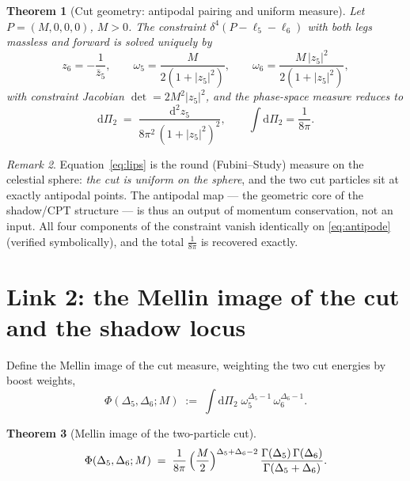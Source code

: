 \documentclass[12pt,a4paper]{article}
\theoremstyle{plain}
\newtheorem{theorem}{Theorem}[section]
\theoremstyle{definition}
\theoremstyle{remark}
\newtheorem{remark}[theorem]{Remark}
\newcommand{\dd}{\mathrm{d}}
\newcommand{\dLIPS}{\dd\Pi_2}
\begin{document}
\begin{theorem}[Cut geometry: antipodal pairing and uniform measure]
\label{thm:measure}
Let $P=(M,0,0,0)$, $M>0$.  The constraint
$\delta^4(P-\ell_5-\ell_6)$ with both legs massless and forward is
solved \emph{uniquely} by
\begin{equation}
z_6=-\frac{1}{\bar z_5},\qquad
\omega_5=\frac{M}{2(1+|z_5|^2)},\qquad
\omega_6=\frac{M\,|z_5|^2}{2(1+|z_5|^2)},
\label{eq:antipode}
\end{equation}
with constraint Jacobian $\det=2M^2|z_5|^2$, and the phase-space
measure reduces to
\begin{equation}
\dLIPS \;=\; \frac{\dd^2 z_5}{8\pi^2\,(1+|z_5|^2)^2},
\qquad \int \dLIPS=\frac{1}{8\pi}.
\label{eq:lips}
\end{equation}
\end{theorem}

\begin{remark}
Equation~\eqref{eq:lips} is the round (Fubini--Study) measure on the
celestial sphere: \emph{the cut is uniform on the sphere}, and the two
cut particles sit at exactly antipodal points.  The antipodal map ---
the geometric core of the shadow/CPT structure --- is thus an output of
momentum conservation, not an input.  All four components of the
constraint vanish identically on \eqref{eq:antipode}
(verified symbolically), and the total $\tfrac{1}{8\pi}$ is recovered
exactly.
\end{remark}

\section{Link 2: the Mellin image of the cut and the shadow locus}
\label{sec:link2}

Define the Mellin image of the cut measure, weighting the two cut
energies by boost weights,
\begin{equation}
\Phi(\Delta_5,\Delta_6;M)\;:=\;\int \dLIPS\;
\omega_5^{\Delta_5-1}\,\omega_6^{\Delta_6-1}.
\end{equation}

\begin{theorem}[Mellin image of the two-particle cut]
\label{thm:mellincut}
\begin{equation}
\Phi(\Delta_5,\Delta_6;M)
\;=\;
\frac{1}{8\pi}\,\Bigl(\frac{M}{2}\Bigr)^{\Delta_5+\Delta_6-2}\,
\frac{\Gamma(\Delta_5)\,\Gamma(\Delta_6)}{\Gamma(\Delta_5+\Delta_6)} .
\label{eq:phi}
\end{equation}
\end{theorem}
\end{document}
